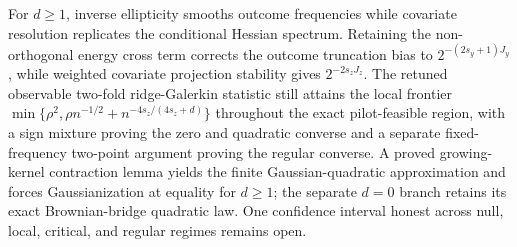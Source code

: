 For \(d\ge1\), inverse ellipticity smooths outcome frequencies while covariate resolution replicates the conditional Hessian spectrum. Retaining the non-orthogonal energy cross term corrects the outcome truncation bias to \(2^{-(2s_y+1)J_y}\), while weighted covariate projection stability gives \(2^{-2s_zJ_z}\). The retuned observable two-fold ridge-Galerkin statistic still attains the local frontier \(\min\{\rho^2,\rho n^{-1/2}+n^{-4s_z/(4s_z+d)}\}\) throughout the exact pilot-feasible region, with a sign mixture proving the zero and quadratic converse and a separate fixed-frequency two-point argument proving the regular converse. A proved growing-kernel contraction lemma yields the finite Gaussian-quadratic approximation and forces Gaussianization at equality for \(d\ge1\); the separate \(d=0\) branch retains its exact Brownian-bridge quadratic law. One confidence interval honest across null, local, critical, and regular regimes remains open.